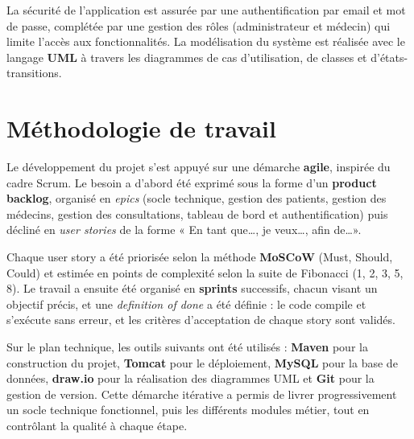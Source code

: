 La sécurité de l'application est assurée par une authentification par email et mot de passe, complétée par une gestion des rôles (administrateur et médecin) qui limite l'accès aux fonctionnalités. La modélisation du système est réalisée avec le langage \textbf{UML} à travers les diagrammes de cas d'utilisation, de classes et d'états-transitions.

\section{Méthodologie de travail}

Le développement du projet s'est appuyé sur une démarche \textbf{agile}, inspirée du cadre Scrum. Le besoin a d'abord été exprimé sous la forme d'un \textbf{product backlog}, organisé en \emph{epics} (socle technique, gestion des patients, gestion des médecins, gestion des consultations, tableau de bord et authentification) puis décliné en \emph{user stories} de la forme « En tant que\ldots, je veux\ldots, afin de\ldots ».

Chaque user story a été priorisée selon la méthode \textbf{MoSCoW} (Must, Should, Could) et estimée en points de complexité selon la suite de Fibonacci (1, 2, 3, 5, 8). Le travail a ensuite été organisé en \textbf{sprints} successifs, chacun visant un objectif précis, et une \emph{definition of done} a été définie : le code compile et s'exécute sans erreur, et les critères d'acceptation de chaque story sont validés.

Sur le plan technique, les outils suivants ont été utilisés : \textbf{Maven} pour la construction du projet, \textbf{Tomcat} pour le déploiement, \textbf{MySQL} pour la base de données, \textbf{draw.io} pour la réalisation des diagrammes UML et \textbf{Git} pour la gestion de version. Cette démarche itérative a permis de livrer progressivement un socle technique fonctionnel, puis les différents modules métier, tout en contrôlant la qualité à chaque étape.
